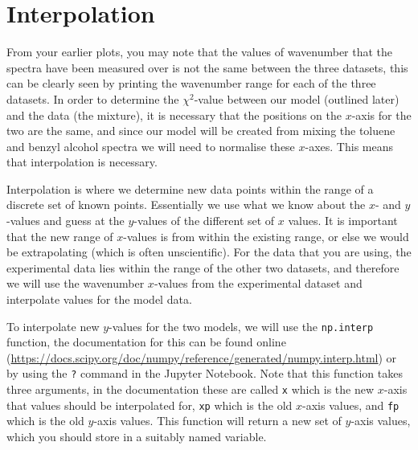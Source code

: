 \documentclass[a4paper]{article}
\begin{document}
\section{Interpolation}
From your earlier plots, you may note that the values of wavenumber that the spectra have been measured over is not the same between the three datasets, this can be clearly seen by printing the wavenumber range for each of the three datasets. 
In order to determine the $\chi^2$-value between our model (outlined later) and the data (the mixture), it is necessary that the positions on the $x$-axis for the two are the same, and since our model will be created from mixing the toluene and benzyl alcohol spectra we will need to normalise these $x$-axes. 
This means that interpolation is necessary. 

Interpolation is where we determine new data points within the range of a discrete set of known points. 
Essentially we use what we know about the $x$- and $y$-values and guess at the $y$-values of the different set of $x$ values. 
It is important that the new range of $x$-values is from within the existing range, or else we would be extrapolating (which is often unscientific). 
For the data that you are using, the experimental data lies within the range of the other two datasets, and therefore we will use the wavenumber $x$-values from the experimental dataset and interpolate values for the model data.

To interpolate new $y$-values for the two models, we will use the \texttt{np.interp} function, the documentation for this can be found online (\url{https://docs.scipy.org/doc/numpy/reference/generated/numpy.interp.html}) or by using the \texttt{?} command in the Jupyter Notebook.
Note that this function takes three arguments, in the documentation these are called \texttt{x} which is the new $x$-axis that values should be interpolated for, \texttt{xp} which is the old $x$-axis values, and \texttt{fp} which is the old $y$-axis values. 
This function will return a new set of $y$-axis values, which you should store in a suitably named variable. 
\end{document}
